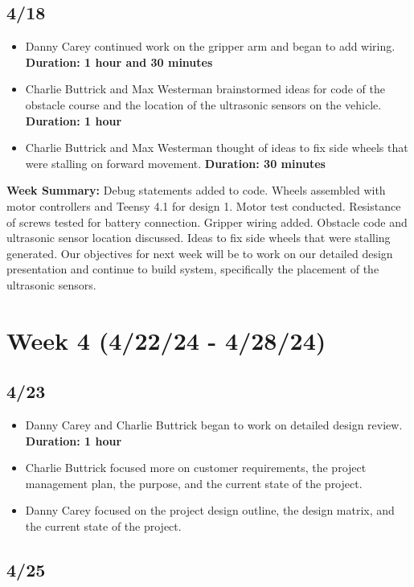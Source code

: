 \documentclass[12pt]{report}
\begin{document}
\subsection*{4/18}

\begin{itemize}
    \item Danny Carey continued work on the gripper arm and began to add wiring. \textbf{Duration: 1 hour and 30 minutes}
    \item Charlie Buttrick and Max Westerman brainstormed ideas for code of the obstacle course and the location of the ultrasonic sensors on the vehicle. \textbf{Duration: 1 hour}
    \item Charlie Buttrick and Max Westerman thought of ideas to fix side wheels that were stalling on forward movement. \textbf{Duration: 30 minutes}
\end{itemize}

\textbf{Week Summary:} Debug statements added to code. Wheels assembled with motor controllers and Teensy 4.1 for design 1. Motor test conducted. Resistance of screws tested for battery connection. Gripper wiring added. Obstacle code and ultrasonic sensor location discussed. Ideas to fix side wheels that were stalling generated. Our objectives for next week will be to work on our detailed design presentation and continue to build system, specifically the placement of the ultrasonic sensors.

\section{Week 4 (4/22/24 - 4/28/24)}
\subsection*{4/23}

\begin{itemize}
    \item Danny Carey and Charlie Buttrick began to work on detailed design review. \textbf{Duration: 1 hour}
    \item Charlie Buttrick focused more on customer requirements, the project management plan, the purpose, and the current state of the project.
    \item Danny Carey focused on the project design outline, the design matrix, and the current state of the project.
\end{itemize}

\subsection*{4/25}
\end{document}
